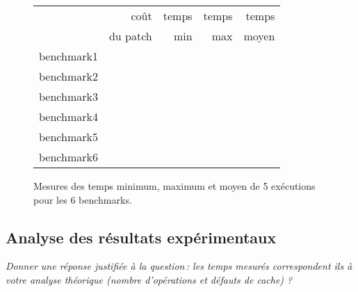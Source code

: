 \documentclass[a4paper, 10pt, french]{article}
\begin{document}
    \begin{figure}[h]
      \begin{center}
        \begin{tabular}{|l||r||r|r|r||}
          \hline
          \hline
            & coût         & temps     & temps   & temps \\
            & du patch     & min       & max     & moyen \\
          \hline
          \hline
            benchmark1 &      &     &     &     \\
          \hline
            benchmark2 &      &     &     &     \\
          \hline
            benchmark3 &      &     &     &     \\
          \hline
            benchmark4 &      &     &     &     \\
          \hline
            benchmark5 &      &     &     &     \\
          \hline
            benchmark6 &      &     &     &     \\
          \hline
          \hline
        \end{tabular}
        \caption{Mesures des temps minimum, maximum et moyen de 5 exécutions pour les 6 benchmarks.}
        \label{table-temps}
      \end{center}
    \end{figure}

\subsection{Analyse des résultats expérimentaux}
{\em Donner  une réponse justifiée  à la question\,: 
              les  temps mesurés correspondent ils  à votre analyse théorique (nombre d’opérations et défauts de cache) ?
}
\end{document}
